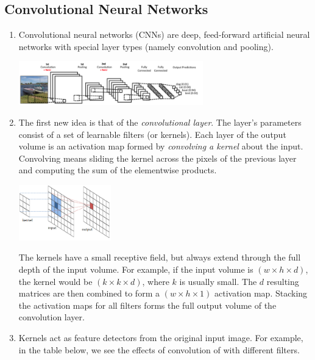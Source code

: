 \documentclass[10pt]{article}
\begin{document}
\begin{multicols}{2}
\begin{addmargin}[0.8em]{0.5em}
    \subsection{Convolutional Neural Networks}
    \begin{enumerate}[label=(\alph*)]
        \item Convolutional neural networks (CNNs) are deep, feed-forward artificial neural networks with special layer types (namely convolution and pooling).
        \vspace{-0.4cm}
        \begin{center}
            \includegraphics[width=8cm]{convnet.png}
        \end{center}    
        
        \item The first new idea is that of the \textit{convolutional layer}. The layer's parameters consist of a set of learnable filters (or kernels). Each layer of the output volume is an activation map formed by \textit{convolving a kernel} about the input. Convolving means sliding the kernel across the pixels of the previous layer and computing the sum of the elementwise products.
        \begin{center}
            \includegraphics[width=4cm]{conv.png}
        \end{center}
        \vspace{-0.2cm}
        The kernels have a small receptive field, but always extend through the full depth of the input volume. For example, if the input volume is $(w \times h \times d)$, the kernel would be $(k \times k \times d)$, where $k$ is usually small. The $d$ resulting matrices are then combined to form a $(w \times h \times 1)$ activation map. Stacking the activation maps for all filters forms the full output volume of the convolution layer.
        
        \item Kernels act as feature detectors from the original input image. For example, in the table below, we see the effects of convolution of with different filters. \\
        

\end{enumerate}
\end{addmargin}
\end{multicols}
\end{document}
